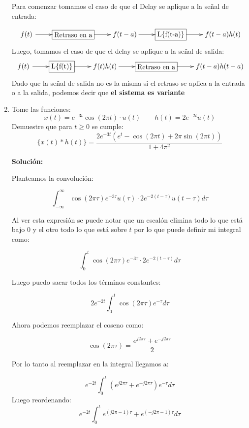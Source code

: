 \documentclass[letterpaper, 12pt]{article}
\newif\ifanswers
\begin{document}
\begin{enumerate}
{        Para comenzar tomamos el caso de que el Delay se aplique a la señal de entrada:
        
        $$
        \xymatrix{*+<1em>{f(t)} \ar[r] & *+[F]\txt{Retraso en a} \ar[r]& f(t-a) \ar[r] & *+[F]\txt{L\{f(t-a)\}} \ar[r] & f(t-a)h(t)}
        $$
        Luego, tomamos el caso de que el delay se aplique a la señal de salida:\\
        $$
        \xymatrix{*+<1em>{f(t)} \ar[r] & *+[F]\txt{L\{f(t)\}} \ar[r]& f(t)h(t) \ar[r] & *+[F]\txt{Retraso en a} \ar[r] & f(t-a)h(t-a)}
        $$
        Dado que la señal de salida no es la misma si el retraso se aplica a la entrada o a la salida, podemos decir que \textbf{el sistema es variante}
   }
    \fi



    \item Tome las funciones:
        $$x(t) = e^{-3 t} \cos {(2 \pi  t)}\cdot u(t) \quad  \quad h(t) = 2 e^{-2t}u(t)$$
         Demuestre que para $t \geq 0$ se cumple:
         $$\{x(t)*h(t)\} = \frac{2e^{-3t}(e^t-\cos{(2\pi t)} + 2\pi\sin{(2 \pi t)})}{1 + 4 \pi^2}$$

    \ifanswers
        {\color{red}
        
        \textbf{Solución:}
    
         Planteamos la convolución:
    
    $$ \int_{-\infty}^{\infty}\cos{(2\pi \tau)}e^{-3\tau}u(\tau) \cdot 2 e^{-2(t-\tau)}u(t-\tau)d \tau$$
    
    Al ver esta expresión se puede notar que un escalón elimina todo lo que está bajo 0 y el otro todo lo que está sobre $t$ por lo que puede definir mi integral como:
    
    $$ \int_{0}^{t}\cos{(2\pi \tau)}e^{-3\tau} \cdot 2 e^{-2(t-\tau)}d \tau$$
    
    Luego puedo sacar todos los términos constantes:
    
    $$ 2e^{-2t}\int_{0}^{t}\cos{(2\pi \tau)}e^{-\tau} d\tau$$
    
    Ahora podemos reemplazar el coseno como:
    
    $$\cos{(2\pi\tau)} = \frac{e^{j2\pi\tau}+ e^{-j2\pi\tau}}{2}$$
    
    Por lo tanto al reemplazar en la integral llegamos a:
    
    $$ e^{-2t}\int_{0}^{t}(e^{j2\pi\tau} + e^{-j2\pi\tau})e^{-\tau} d\tau $$
    Luego reordenando:
    $$ e^{-2t}\int_{0}^{t}e^{(j2\pi-1)\tau} + e^{(-j2\pi-1)\tau}  d\tau $$
    
}
\end{enumerate}
\end{document}
